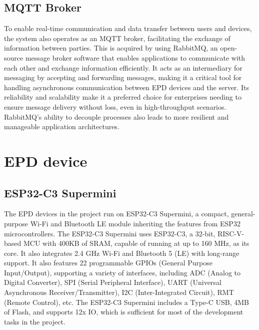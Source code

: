 \documentclass[../Main.tex]{subfiles}
\begin{document}
\subsection{MQTT Broker}
To enable real-time communication and data transfer between users and devices, the system also operates as an MQTT broker, facilitating the exchange of information between parties. This is acquired by using RabbitMQ, an open-source message broker software that enables applications to communicate with each other and exchange information efficiently. It acts as an intermediary for messaging by accepting and forwarding messages, making it a critical tool for handling asynchronous communication between \gls{EPD} devices and the server. Its reliability and scalability make it a preferred choice for enterprises needing to ensure message delivery without loss, even in high-throughput scenarios. RabbitMQ's ability to decouple processes also leads to more resilient and manageable application architectures.

\section{EPD device}
\subsection{ESP32-C3 Supermini}
The \gls{EPD} devices in the project run on ESP32-C3 Supermini, a compact, general-purpose Wi-Fi and Bluetooth LE module inheriting the features from ESP32 microcontrollers. The ESP32-C3 Supermini uses ESP32-C3, a 32-bit, RISC-V-based MCU with 400KB of SRAM, capable of running at up to 160 MHz, as its core. It also integrates 2.4 GHz Wi-Fi and Bluetooth 5 (LE) with long-range support. It also features 22 programmable GPIOs (General Purpose Input/Output), supporting a variety of interfaces, including ADC (Analog to Digital Converter), SPI (Serial Peripheral Interface), UART (Universal Asynchronous Receiver/Transmitter), I2C (Inter-Integrated Circuit), RMT (Remote Control), etc. The ESP32-C3 Supermini includes a Type-C USB, 4MB of Flash, and supports 12x IO, which is sufficient for most of the development tasks in the project\cite{espdatasheet}.
\end{document}
